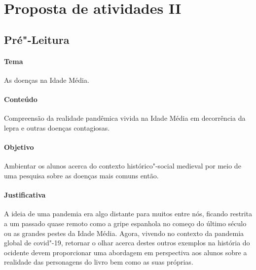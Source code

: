 \documentclass[12pt]{extarticle}
\begin{document}

\section{Proposta de atividades II}


\subsection{Pré"-Leitura}

 \paragraph{Tema} As doenças na Idade Média.

 \paragraph{Conteúdo} Compreensão da realidade pandêmica vivida na Idade
 Média em decorrência da lepra e outras doenças contagiosas.

 \paragraph{Objetivo} Ambientar os alunos acerca do contexto histórico"-social 
 medieval por meio de uma pesquisa sobre as doenças mais comuns então.

 \paragraph{Justificativa} A ideia de uma pandemia era algo distante para
 muitos entre nós, ficando restrita a um passado quase remoto como a gripe
 espanhola no começo do último século ou as grandes pestes da Idade Média. 
 Agora, vivendo no contexto da pandemia global de covid"-19, retornar o
 olhar acerca destes outros exemplos na história do ocidente devem proporcionar 
 uma abordagem em perspectiva aos alunos sobre a realidade das personagens 
 do livro bem como as suas próprias.
\end{document}
